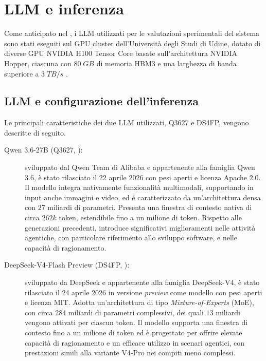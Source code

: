 \renewcommand{\chaptername}{Appendice}

\chapter{LLM e inferenza} \label{app:llm}

Come anticipato nel , i LLM utilizzati per le valutazioni sperimentali del sistema sono stati eseguiti sul GPU
cluster dell'Università degli Studi di Udine, dotato di diverse GPU NVIDIA H100 Tensor Core basate sull'architettura NVIDIA Hopper, ciascuna con $80\; GB$ di memoria HBM3 e una larghezza di banda superiore a $3\; TB/s$ \cite{nvidia2024datasheet}.

\section{LLM e configurazione dell'inferenza}

Le principali caratteristiche dei due LLM utilizzati, Q3627 e DS4FP, vengono descritte di seguito.

\begin{description}
    \item[Qwen 3.6-27B \normalfont(Q3627, \cite{alibaba2026qwen3627b}):] sviluppato dal Qwen Team di Alibaba e appartenente alla famiglia Qwen 3.6, è stato rilasciato il 22 aprile 2026 con pesi aperti e licenza Apache 2.0. Il modello integra nativamente funzionalità multimodali, supportando in input anche immagini e video, ed è caratterizzato da un'architettura densa con $27$ miliardi di parametri. Presenta una finestra di contesto nativa di circa $262k$ token, estendibile fino a un milione di token. Rispetto alle generazioni precedenti, introduce significativi miglioramenti nelle attività agentiche, con particolare riferimento allo sviluppo software, e nelle capacità di ragionamento.
    

    \item[DeepSeek-V4-Flash Preview \normalfont(DS4FP, \cite{deepseekai2026deepseekv4}):] sviluppato da DeepSeek e appartenente alla famiglia DeepSeek-V4, è stato rilasciato il 24 aprile 2026 in versione \emph{preview} come modello con pesi aperti e licenza MIT. Adotta un'architettura di tipo \emph{Mixture-of-Experts} (MoE), con circa 284 miliardi di parametri complessivi, dei quali $13$ miliardi vengono attivati per ciascun token. Il modello supporta una finestra di contesto fino a un milione di token ed è progettato per offrire elevate capacità di ragionamento e un efficace utilizzo in scenari agentici, con prestazioni simili alla variante V4-Pro nei compiti meno complessi.
\end{description}

